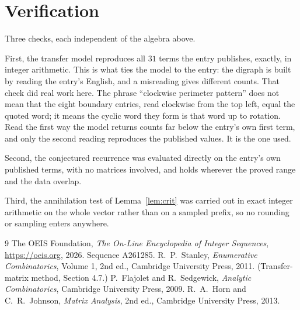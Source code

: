 \documentclass[11pt,a4paper]{article}
\theoremstyle{plain}
\theoremstyle{definition}
\begin{document}
\section{Verification}

Three checks, each independent of the algebra above.

First, the transfer model reproduces all $31$ terms the entry publishes, exactly, in
integer arithmetic. This is what ties the model to the entry: the digraph is built by reading
the entry's English, and a misreading gives different counts. That check did real work here. The phrase ``clockwise perimeter pattern'' does not mean that the eight boundary entries, read clockwise from the top left, equal the quoted word; it means the cyclic word they form is that word up to rotation. Read the first way the model returns counts far below the entry's own first term, and only the second reading reproduces the published values. It is the one used.

Second, the conjectured recurrence was evaluated directly on the entry's own published terms,
with no matrices involved, and holds wherever the proved range and the data overlap.

Third, the annihilation test of Lemma~\ref{lem:crit} was carried out in exact integer
arithmetic on the whole vector rather than on a sampled prefix, so no rounding or sampling
enters anywhere.

\begin{thebibliography}{9}
 The OEIS Foundation, \emph{The On-Line Encyclopedia of Integer
Sequences}, \url{https://oeis.org}, 2026. Sequence A261285.
 R.~P.~Stanley, \emph{Enumerative Combinatorics}, Volume 1, 2nd ed.,
Cambridge University Press, 2011. (Transfer-matrix method, Section 4.7.)
 P.~Flajolet and R.~Sedgewick, \emph{Analytic Combinatorics}, Cambridge
University Press, 2009.
 R.~A.~Horn and C.~R.~Johnson, \emph{Matrix Analysis}, 2nd ed., Cambridge
University Press, 2013.
\end{thebibliography}
\end{document}
